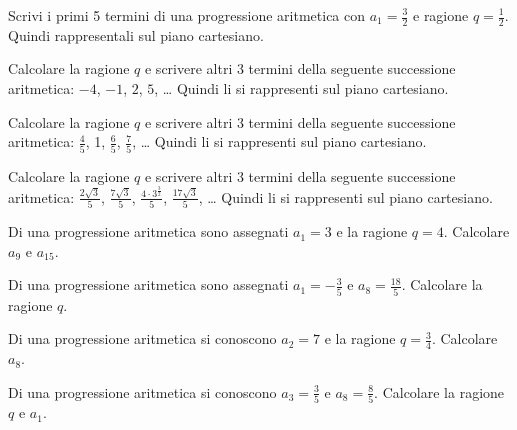 \begin{esercizio}
\label{ese:8a_progr.2}
Scrivi i primi 5 termini di una progressione aritmetica con $a_1=\frac{3}{2}$ e ragione $q=\frac{1}{2}$. Quindi rappresentali sul piano cartesiano.
\end{esercizio}

\begin{esercizio}
\label{ese:8a_progr.3}
Calcolare la ragione $q$ e scrivere altri 3 termini della seguente successione aritmetica: $-4$, $-1$, $2$, $5$, \ldots{} Quindi li si rappresenti sul piano cartesiano.
\end{esercizio}

\begin{esercizio}
\label{ese:8a_progr.4}
Calcolare la ragione $q$ e scrivere altri 3 termini della seguente successione aritmetica: $\frac{4}{5}$, 1, $\frac{6}{5}$, $\frac{7}{5}$, \ldots{} Quindi li si rappresenti sul piano cartesiano.
\end{esercizio}

\begin{esercizio}
\label{ese:8a_progr.5}
Calcolare la ragione $q$ e scrivere altri 3 termini della seguente successione aritmetica: $\frac{2\sqrt{3}}{5}$, $\frac{7\sqrt{3}}{5}$, $\frac{4\cdot3^{\frac{3}{2}}}{5}$, $\frac{17\sqrt{3}}{5}$, \ldots{} Quindi li si rappresenti sul piano cartesiano.
\end{esercizio}

\begin{esercizio}
\label{ese:8a_progr.6}
Di una progressione aritmetica sono assegnati $a_1=3$ e la ragione $q=4$. Calcolare $a_9$ e $a_{15}$.
\end{esercizio}

\begin{esercizio}
\label{ese:8a_progr.7}
Di una progressione aritmetica sono assegnati $a_1=-\frac{3}{5}$ e $a_8=\frac{18}{5}$. Calcolare la ragione $q$.
\end{esercizio}

\begin{esercizio}
\label{ese:8a_progr.8}
Di una progressione aritmetica si conoscono $a_2=7$ e la ragione $q=\frac{3}{4}$. Calcolare $a_8$.
\end{esercizio}

\begin{esercizio}
\label{ese:8a_progr.9}
Di una progressione aritmetica si conoscono $a_3=\frac{3}{5}$ e $a_8=\frac{8}{5}$. Calcolare la ragione $q$ e $a_1$.
\end{esercizio}


